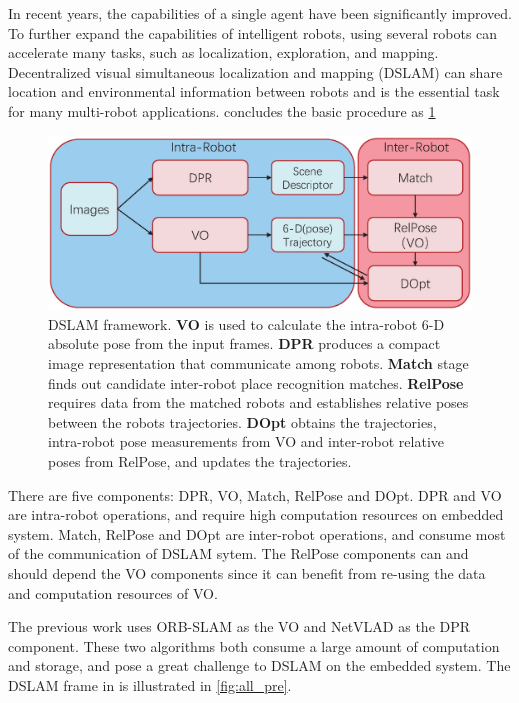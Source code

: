 \label{sec:introdutction}
In recent years, the capabilities of a single agent have been significantly improved. To further expand the capabilities of intelligent robots, using several robots can accelerate many tasks, such as localization, exploration, and mapping.
Decentralized visual simultaneous localization and
mapping (DSLAM) can share location and environmental information between robots and is the essential task for many multi-robot applications. \cite{Cieslewski:20187ee} concludes the basic procedure as \cref{fig:all}

\begin{figure}[h]  
    \centering  
    \includegraphics[width=0.75\linewidth]{fig/all.eps}
    \caption{DSLAM framework\cite{Cieslewski:20187ee}. \textbf{VO} is used to calculate the intra-robot 6-D absolute pose from the input frames. \textbf{DPR} produces a compact image representation that communicate among robots. \textbf{Match} stage finds out candidate inter-robot place recognition matches.  \textbf{RelPose} requires data from the matched robots and establishes relative poses between the robots trajectories. \textbf{DOpt} obtains the trajectories, intra-robot pose measurements from VO and inter-robot relative poses from RelPose, and updates the trajectories.}
    \label{fig:all}
\end{figure}

There are five components: DPR, VO, Match, RelPose and DOpt. DPR and VO are intra-robot operations, and require high computation resources on embedded system. Match, RelPose and DOpt are inter-robot operations, and consume most of the communication of DSLAM sytem. The RelPose components can and should depend the VO components since it can benefit from re-using the data and computation resources of VO.

The previous work \cite{Cieslewski:20187ee} uses ORB-SLAM\cite{Mur-Artal:2017281} as the VO and NetVLAD\cite{Arandjelovic:2017997} as the DPR component. These two algorithms both consume a large amount of computation and storage, and pose a great challenge to DSLAM on the embedded system. The DSLAM frame in \cite{Cieslewski:20187ee} is illustrated in \cref{fig:all_pre}.


